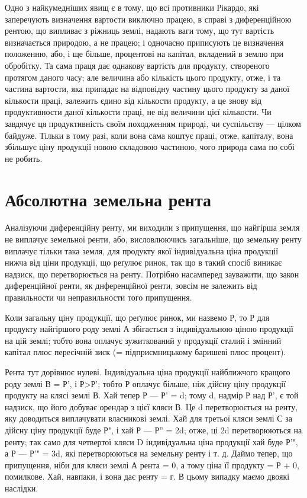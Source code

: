 Одно з найкумедніших явищ є в тому, що всі противники Рікардо, які
заперечують визначення вартости виключно працею, в справі з диференційною
рентою, що випливає з ріжниць землі, надають ваги тому, що тут вартість
визначається природою, а не працею; і одночасно приписують це визначення
положенню, або, і ще більше, процентові на капітал, вкладений в землю при
обробітку. Та сама праця дає однакову вартість для продукту, створеного
протягом даного часу; але величина або кількість цього продукту, отже, і та
частина вартости, яка припадає на відповідну частину цього продукту за даної
кількости праці, залежить єдино від кількости продукту, а це знову від продуктивности
даної кількости праці, не від величини цієї кількости. Чи завдячує
ця продуктивність своїм походженням природі, чи суспільству — цілком байдуже.
Тільки в тому разі, коли вона сама коштує праці, отже, капіталу, вона
збільшує ціну продукції новою складовою частиною, чого природа сама по собі
не робить.

\section{Абсолютна земельна рента}

Аналізуючи диференційну ренту, ми виходили з припущення, що найгірша
земля не виплачує земельної ренти, або, висловлюючись загальніше, що земельну
ренту виплачує тільки така земля, для продукту якої індивідуальна ціна продукції
нижча від ціни продукції, що реґулює ринок, так що в такий спосіб
виникає надзиск, що перетворюється на ренту. Потрібно насамперед зауважити,
що закон диференційної ренти, як днференційної ренти, зовсім не залежить від
правильности чи неправильности того припущення.

Коли загальну ціну продукції, що реґулює ринок, ми назвемо Р, то Р для
продукту найгіршого роду землі А збігається з індивідуальною ціною продукції
на цій землі; тобто вона оплачує зужиткований у продукції сталий і змінний капітал
плюс пересічній зиск (= підприємницькому баришеві плюс процент).

Рента тут дорівнює нулеві. Індивідуальна ціна продукції найближчого
кращого роду землі В = Р', і Р>Р'; тобто Р оплачує більше, ніж дійсну
ціну продукції продукту на клясі землі В. Хай тепер Р — Р' = d; тому
d, надмір Р над Р', є той надзиск, що його добуває орендар з цієї кляси В.
Це d перетворюється на ренту, яку доводиться виплачувати власникові землі.
Хай для третьої кляси землі С за дійсну ціну продукції буде Р", і хай Р —
Р'' = 2d; отже, ці 2d перетворюються на ренту; так само для четвертої кляси
D індивідуальна ціна продукції хай буде Р'", а Р — Р'" = 3d, які перетворюються
на земельну ренту і т. д. Даймо тепер, що припущення, ніби для
кляси землі А рента = 0, а тому ціна її продукту = Р + 0, помилкове. Хай,
навпаки, і вона дає ренту = г. В цьому випадку маємо двоякі наслідки.

